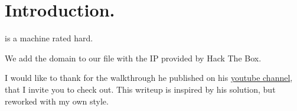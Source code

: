 \section{Introduction.}
\par {} is a machine rated hard.
\par We add the domain  to our  file with the IP provided by Hack The Box.
\par I would like to thank  for the walkthrough he published on his \href{https://www.youtube.com/c/ippsec}{youtube channel}, that I invite you to check out. This writeup is inspired by his solution, but reworked with my own style.
